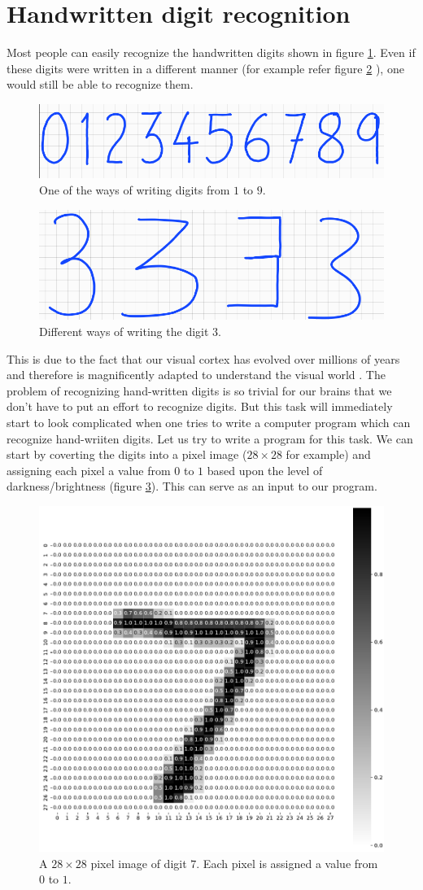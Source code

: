 \section{Handwritten digit recognition}
Most people can easily recognize the handwritten digits shown in figure \ref{fig:my_digits}. Even if these digits were written 
in a different manner (for example refer figure \ref{fig:my_threes} ), one would still be able to recognize them. 
\begin{figure}[htbp]
    \centering
    \includegraphics[width=.6\textwidth]{Figures/digits.png}
    \caption{One of the ways of writing digits from $1$ to $9$.}
    \label{fig:my_digits}
\end{figure} 
\begin{figure}[htbp]
    \centering
    \includegraphics[width=.3\textwidth]{Figures/three_digit.png}
    \caption{Different ways of writing the digit $3$.}
    \label{fig:my_threes}
\end{figure} This is due to the fact that our visual cortex has evolved over millions of years and therefore is magnificently 
adapted to understand the visual world \cite{vis_cortex}. The problem of recognizing hand-written digits is so trivial 
for our brains that we don't have to put an effort to recognize digits. But this task will immediately 
start to look complicated when one tries to write a computer program which can recognize hand-wriiten 
digits. 
Let us try to write a program for this task. We can start by coverting the digits into a pixel 
image ($28 \times 28$ for example) and assigning each pixel a value from $0$ to $1$ based upon the level of 
darkness/brightness (figure \ref{fig:pix7}). This can serve as an input to our program. 
\begin{figure}[htbp]
    \centering
    \includegraphics[width=.35\textwidth]{Figures/pixel_image_7.png}
    \caption{A $28 \times 28$ pixel image of digit $7$. Each pixel is assigned a value from $0$ to $1$.}
    \label{fig:pix7}
\end{figure} 

